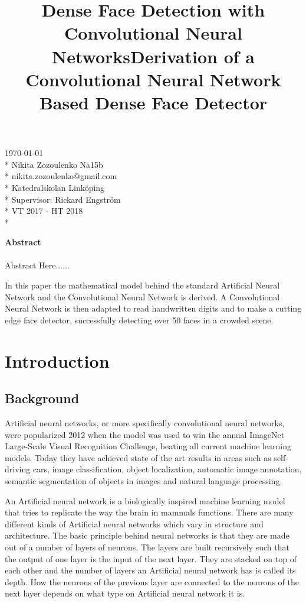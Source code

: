 \documentclass[a4paper,11pt,twoside]{article}
\title{Dense Face Detection with Convolutional Neural Networks}
\title{Derivation of a Convolutional Neural Network Based Dense Face Detector}
\date{}
\begin{document}
\maketitle
\vfill

\begin{flushright}
\today \\*
Nikita Zozoulenko Na15b \\*
nikita.zozoulenko@gmail.com \\*
Katedralskolan Linköping\\*
Supervisor: Rickard Engström \\*
VT 2017 - HT 2018 \\*
\end{flushright}
\newpage

\Large{\textbf{Abstract}}\\\\
Abstract Here......

In this paper the mathematical model behind the standard Artificial Neural Network and the Convolutional Neural Network is derived. A Convolutional Neural Network is then adapted to read handwritten digits and to make a cutting edge face detector, successfully detecting over 50 faces in a crowded scene.
\newpage

\tableofcontents

\section{Introduction}

\subsection{Background}
Artificial neural networks, or more specifically convolutional neural networks, were popularized 2012 when the model was used to win the annual ImageNet Large-Scale Visual Recognition Challenge, beating all current machine learning models. Today they have achieved state of the art results in areas such as self-driving cars, image classification, object localization, automatic image annotation, semantic segmentation of objects in images and natural language processing. 
\cite{cs231n}

An Artificial neural network is a biologically inspired machine learning model that tries to replicate the way the brain in mammals functions. There are many different kinds of Artificial neural networks which vary in structure and architecture. The basic principle behind neural networks is that they are made out of a number of layers of neurons. The layers are built recursively such that the output of one layer is the input of the next layer. They are stacked on top of each other and the number of layers an Artificial neural network has is called its depth. How the neurons of the previous layer are connected to the neurons of the next layer depends on what type on Artificial neural network it is.
\cite{cs231n}
\end{document}
